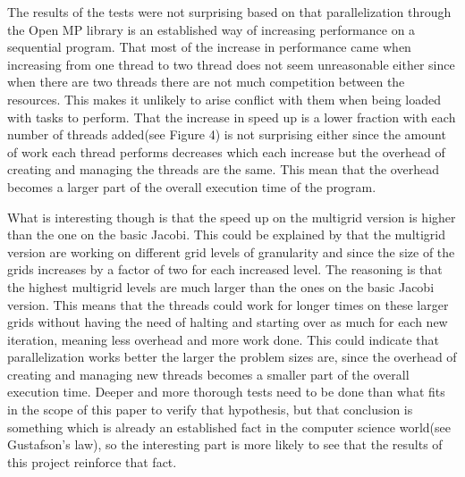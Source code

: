 \documentclass{article}
\begin{document}
The results of the tests were not surprising based on that parallelization through the Open MP library is an established way of increasing performance on a sequential program. That most of the increase in performance came when increasing from one thread to two thread does not seem unreasonable either since when there are two threads there are not much competition between the resources. This makes it unlikely to arise conflict with them when being loaded with tasks to perform. That the increase in speed up is a lower fraction with each number of threads added(see Figure 4) is not surprising either since the amount of work each thread performs decreases which each increase but the overhead of creating and managing the threads are the same. This mean that the overhead becomes a larger part of the overall execution time of the program. 

What is interesting though is that the speed up on the multigrid version is higher than the one on the basic Jacobi. This could be explained by that the multigrid version are working on different grid levels of granularity and since the size of the grids increases by a factor of two for each increased level. The reasoning is that the highest multigrid levels are much larger than the ones on the basic Jacobi version. This means that the threads could work for longer times on these larger grids without having the need of halting and starting over as much for each new iteration, meaning less overhead and more work done. This could indicate that parallelization works better the larger the problem sizes are, since the overhead of creating and managing new threads becomes a smaller part of the overall execution time. Deeper and more thorough tests need to be done than what fits in the scope of this paper to verify that hypothesis, but that conclusion is something which is already an established fact in the computer science world(see Gustafson’s law), so the interesting part is more likely to see that the results of this project reinforce that fact. 
\end{document}
